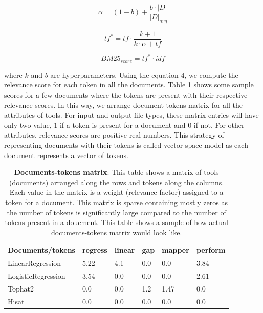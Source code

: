\begin{equation}
\alpha = (1-b) + \frac{b \cdot |D|}{|D|_{avg}}
\end{equation}

\begin{equation}
tf^* = tf \cdot \frac{k+1}{k \cdot \alpha + tf}
\end{equation}

\begin{equation}
BM25_{score} =tf^* \cdot idf
\end{equation}

where $k$ and $b$ are hyperparameters. Using the equation $4$, we compute the relevance score for each token in all the documents. Table 1 shows some sample scores for a few documents where the tokens are present with their respective relevance scores. In this way, we arrange document-tokens matrix for all the attributes of tools. For input and output file types, these matrix entries will have only two value, $1$ if a token is present for a document and $0$ if not. For other attributes, relevance scores are positive real numbers. This strategy of representing documents with their tokens is called vector space model as each document represents a vector of tokens.

\begin{table}[ht]
\begin{center}
    \begin{tabular}{|l|l|l|l|l|l|}
        \hline
        Documents/tokens   & regress & linear & gap & mapper & perform \\ \hline
        LinearRegression   & 5.22 & 4.1 & 0.0 & 0.0  & 3.84 \\ \hline
        LogisticRegression & 3.54 & 0.0 & 0.0 & 0.0  & 2.61 \\ \hline
        Tophat2            & 0.0  & 0.0 & 1.2 & 1.47 & 0.0 \\ \hline
        Hisat              & 0.0  & 0.0 & 0.0 & 0.0  & 0.0 \\ \hline
    \end{tabular}
    \end{center}
    \caption[Documents-tokens matrix]{\textbf{Documents-tokens matrix}: This table shows a matrix of tools (documents) arranged along the rows and tokens along the columns. Each value in the matrix is a weight (relevance-factor) assigned to a token for a document. This matrix is sparse containing mostly zeros as the number of tokens is significantly large compared to the number of tokens present in a doucment. This table shows a sample of how actual documents-tokens matrix would look like. }
    \label{tab:accuracy}
\end{table}

